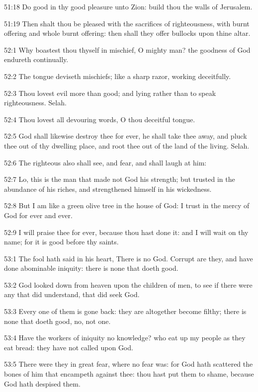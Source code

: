51:18 Do good in thy good pleasure unto Zion: build thou the walls of
Jerusalem.

51:19 Then shalt thou be pleased with the sacrifices of righteousness,
with burnt offering and whole burnt offering: then shall they offer
bullocks upon thine altar.



52:1 Why boastest thou thyself in mischief, O mighty man? the goodness
of God endureth continually.

52:2 The tongue deviseth mischiefs; like a sharp razor, working
deceitfully.

52:3 Thou lovest evil more than good; and lying rather than to speak
righteousness. Selah.

52:4 Thou lovest all devouring words, O thou deceitful tongue.

52:5 God shall likewise destroy thee for ever, he shall take thee
away, and pluck thee out of thy dwelling place, and root thee out of
the land of the living. Selah.

52:6 The righteous also shall see, and fear, and shall laugh at him:

52:7 Lo, this is the man that made not God his strength; but trusted
in the abundance of his riches, and strengthened himself in his
wickedness.

52:8 But I am like a green olive tree in the house of God: I trust in
the mercy of God for ever and ever.

52:9 I will praise thee for ever, because thou hast done it: and I
will wait on thy name; for it is good before thy saints.



53:1 The fool hath said in his heart, There is no God. Corrupt are
they, and have done abominable iniquity: there is none that doeth
good.

53:2 God looked down from heaven upon the children of men, to see if
there were any that did understand, that did seek God.

53:3 Every one of them is gone back: they are altogether become
filthy; there is none that doeth good, no, not one.

53:4 Have the workers of iniquity no knowledge? who eat up my people
as they eat bread: they have not called upon God.

53:5 There were they in great fear, where no fear was: for God hath
scattered the bones of him that encampeth against thee: thou hast put
them to shame, because God hath despised them.

